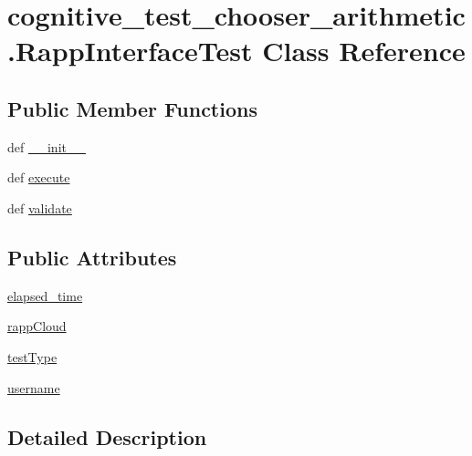 \hypertarget{classcognitive__test__chooser__arithmetic_1_1RappInterfaceTest}{\section{cognitive\-\_\-test\-\_\-chooser\-\_\-arithmetic.\-Rapp\-Interface\-Test Class Reference}
\label{classcognitive__test__chooser__arithmetic_1_1RappInterfaceTest}
}
\subsection*{Public Member Functions}
\begin{DoxyCompactItemize}
\item 
def \hyperlink{classcognitive__test__chooser__arithmetic_1_1RappInterfaceTest_a27123038961fe977abd744b79f4ef327}{\-\_\-\-\_\-init\-\_\-\-\_\-}
\item 
def \hyperlink{classcognitive__test__chooser__arithmetic_1_1RappInterfaceTest_a9d31900fee9bbfc760b138529823c37f}{execute}
\item 
def \hyperlink{classcognitive__test__chooser__arithmetic_1_1RappInterfaceTest_a5e7dba48a0d9c6ab393265c31c6de8b9}{validate}
\end{DoxyCompactItemize}
\subsection*{Public Attributes}
\begin{DoxyCompactItemize}
\item 
\hyperlink{classcognitive__test__chooser__arithmetic_1_1RappInterfaceTest_a72e1a18250577ff95c5dce3af86dc792}{elapsed\-\_\-time}
\item 
\hyperlink{classcognitive__test__chooser__arithmetic_1_1RappInterfaceTest_a121b0d6b0186cfc8bfb4e65924e55533}{rapp\-Cloud}
\item 
\hyperlink{classcognitive__test__chooser__arithmetic_1_1RappInterfaceTest_a4114c479e308297229e8282bf1801e3a}{test\-Type}
\item 
\hyperlink{classcognitive__test__chooser__arithmetic_1_1RappInterfaceTest_a45c38133747a8a2ba8aa2969b1534cc6}{username}
\end{DoxyCompactItemize}


\subsection{Detailed Description}


